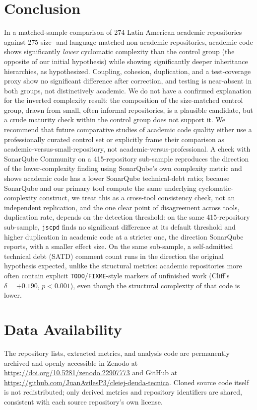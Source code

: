 \documentclass{cleiej}
\begin{document}
\section{Conclusion}

In a matched-sample comparison of 274 Latin American academic repositories against 275 size- and language-matched non-academic repositories, academic code shows significantly \emph{lower} cyclomatic complexity than the control group (the opposite of our initial hypothesis) while showing significantly deeper inheritance hierarchies, as hypothesized. Coupling, cohesion, duplication, and a test-coverage proxy show no significant difference after correction, and testing is near-absent in both groups, not distinctively academic. We do not have a confirmed explanation for the inverted complexity result: the composition of the size-matched control group, drawn from small, often informal repositories, is a plausible candidate, but a crude maturity check within the control group does not support it. We recommend that future comparative studies of academic code quality either use a professionally curated control set or explicitly frame their comparison as academic-versus-small-repository, not academic-versus-professional. A check with SonarQube Community on a 415-repository sub-sample reproduces the direction of the lower-complexity finding using SonarQube's own complexity metric and shows academic code has a lower SonarQube technical-debt ratio; because SonarQube and our primary tool compute the same underlying cyclomatic-complexity construct, we treat this as a cross-tool consistency check, not an independent replication, and the one clear point of disagreement across tools, duplication rate, depends on the detection threshold: on the same 415-repository sub-sample, \texttt{jscpd} finds no significant difference at its default threshold and higher duplication in academic code at a stricter one, the direction SonarQube reports, with a smaller effect size. On the same sub-sample, a self-admitted technical debt (SATD) comment count runs in the direction the original hypothesis expected, unlike the structural metrics: academic repositories more often contain explicit \texttt{TODO}/\texttt{FIXME}-style markers of unfinished work (Cliff's $\delta=+0.190$, $p<0.001$), even though the structural complexity of that code is lower.

\section*{Data Availability}
The repository lists, extracted metrics, and analysis code are permanently archived and openly accessible in Zenodo at \url{https://doi.org/10.5281/zenodo.22907773} and GitHub at \url{https://github.com/JuanAvilesP3/cleiej-deuda-tecnica}. Cloned source code itself is not redistributed; only derived metrics and repository identifiers are shared, consistent with each source repository's own license.
\end{document}
